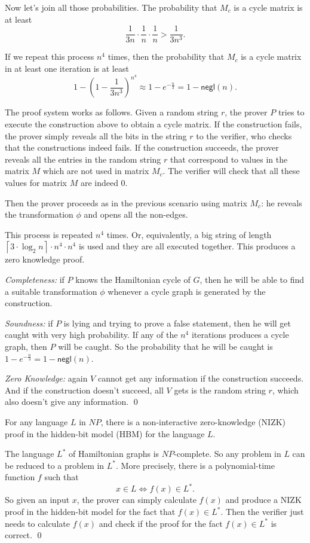 Now let's join all those probabilities. The probability that $M_c$ is a cycle matrix is at least
$$\frac{1}{3n}\cdot \frac{1}{n}\cdot \frac{1}{n} > \frac{1}{3n^3}.$$

If we repeat this process $n^4$ times, then the probability that $M_c$ is a cycle matrix in at least one iteration is at least
$$1-\left(1-\frac{1}{3n^3}\right)^{n^4}\approx 1-e^{-\frac{n}{3}} = 1-\mathsf{negl}(n).$$


\bigskip
The proof system works as follows. Given a random string $r$, the prover $P$ tries
to execute the construction above to obtain a cycle matrix.
If the construction fails, the prover simply reveals all the bits in the string $r$
to the verifier, who checks that the constructions indeed fails.
If the construction succeeds, the prover reveals all the entries in the random string $r$
that correspond to values in the matrix $M$ which are not used in matrix $M_c$.
The verifier will check that all these values for matrix $M$ are indeed 0.

Then the prover proceeds as in the previous scenario using matrix $M_c$: he
reveals the transformation $\phi$ and opens all the non-edges.

This process is repeated $n^4$ times. Or, equivalently, a big string of length
$\left\lceil 3\cdot \log_2 n\right\rceil \cdot n^4\cdot n^4$ is used and they are all
executed together. This produces a zero knowledge proof.

\textit{Completeness:} if $P$ knows the Hamiltonian cycle of $G$,
then he will be able to find a suitable transformation $\phi$ whenever a cycle graph is
generated by the construction.

\textit{Soundness:} if $P$ is lying and trying to prove a false statement, then he will
get caught with very high probability. If any of the $n^4$ iterations produces a cycle
graph, then $P$ will be caught. So the probability that he will be caught is
$1-e^{-\frac{n}{3}} = 1-\mathsf{negl}(n)$.

\textit{Zero Knowledge:} again $V$ cannot get any information if the construction succeeds.
And if the construction doesn't succeed, all $V$ gets is the random string $r$, which also
doesn't give any information.
\qed


\begin{theorem}
For any language $L$ in $NP$, there is a non-interactive zero-knowledge (NIZK) proof
in the hidden-bit model (HBM) for the language $L$.
\end{theorem}
\proof
The language $L^*$ of Hamiltonian graphs is $NP$-complete. So any problem in $L$ can
be reduced to a problem in $L^*$. More precisely, there is a polynomial-time function
$f$ such that
$$x\in L \Longleftrightarrow f(x)\in L^*.$$
So given an input $x$, the prover can simply calculate $f(x)$ and
produce a NIZK proof in the hidden-bit model for the fact that $f(x)\in L^*$.
Then the verifier just needs to calculate $f(x)$ and check if the proof for the fact
$f(x)\in L^*$ is correct.
\qed

